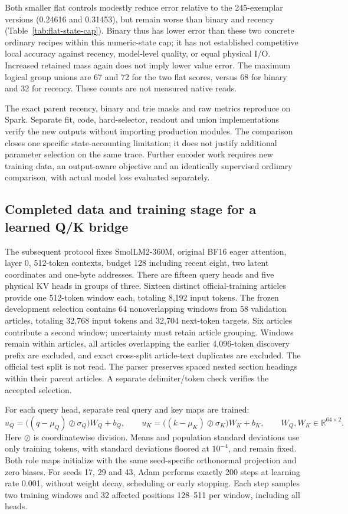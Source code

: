 \documentclass[11pt]{article}
\newcommand{\R}{\mathbb{R}}
\begin{document}
Both smaller flat controls modestly reduce error relative to the 245-exemplar
versions (0.24616 and 0.31453), but remain worse than binary and recency
(Table~\ref{tab:flat-state-cap}). Binary thus has lower error than these two
concrete ordinary recipes within this numeric-state cap; it has not established
competitive local accuracy against recency, model-level quality, or equal
physical I/O. Increased retained mass again does not imply lower value error.
The maximum logical group unions are 67 and 72 for the two flat scores, versus
68 for binary and 32 for recency. These counts are not measured native reads.

The exact parent recency, binary and trie masks and raw metrics reproduce on
Spark. Separate fit, code, hard-selector, readout and union implementations
verify the new outputs without importing production modules. The comparison
closes one specific state-accounting limitation; it does not justify additional
parameter selection on the same trace. Further encoder work requires new
training data, an output-aware objective and an identically supervised ordinary
comparison, with actual model loss evaluated separately.

\subsection{Completed data and training stage for a learned Q/K bridge}
\label{sec:learned-training}

The subsequent protocol fixes SmolLM2-360M, original BF16 eager attention,
layer 0, 512-token contexts, budget 128 including recent eight, two latent
coordinates and one-byte addresses. There are fifteen query heads and five
physical KV heads in groups of three. Sixteen distinct official-training
articles provide one 512-token window each, totaling 8,192 input tokens.
The frozen development selection contains 64 nonoverlapping windows from
58 validation articles, totaling 32,768 input tokens and 32,704 next-token
targets. Six articles contribute a second window; uncertainty must retain
article grouping. Windows remain within articles, all articles overlapping
the earlier 4,096-token discovery prefix are excluded, and exact cross-split
article-text duplicates are excluded. The official test split is not read.
The parser preserves spaced nested section headings within their parent
articles. A separate delimiter/token check verifies the accepted selection.

For each query head, separate real query and key maps are trained:
\[
 u_Q=\bigl((q-\mu_Q)\oslash\sigma_Q\bigr)W_Q+b_Q,
 \qquad
 u_K=\bigl((k-\mu_K)\oslash\sigma_K\bigr)W_K+b_K,
 \qquad W_Q,W_K\in\R^{64\times2}.
\]
Here \(\oslash\) is coordinatewise division. Means and population standard
deviations use only training tokens, with standard deviations floored at
\(10^{-4}\), and remain fixed. Both role maps initialize with the same
seed-specific orthonormal projection and zero biases. For seeds 17, 29 and 43,
Adam performs exactly 200 steps at learning rate 0.001, without weight decay,
scheduling or early stopping. Each step samples two training windows and
32 affected positions 128--511 per window, including all heads.
\end{document}
